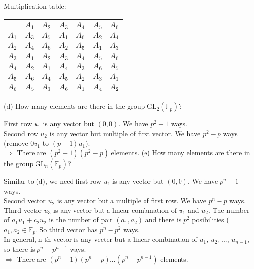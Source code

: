     Multiplication table:
    
    \begin{center}
        \begin{tabular}{|c||c|c|c|c|c|c|}
            \hline
            & $A_1$ & $A_2$ & $A_3$ & $A_4$ & $A_5$ & $A_6$ \\ \hline\hline
            $A_1$ & $A_3$ & $A_5$ & $A_1$ & $A_6$ & $A_2$ & $A_4$ \\ \hline
            $A_2$ & $A_4$ & $A_6$ & $A_2$ & $A_5$ & $A_1$ & $A_3$ \\ \hline
            $A_3$ & $A_1$ & $A_2$ & $A_3$ & $A_4$ & $A_5$ & $A_6$ \\ \hline
            $A_4$ & $A_2$ & $A_1$ & $A_4$ & $A_3$ & $A_6$ & $A_5$ \\ \hline
            $A_5$ & $A_6$ & $A_4$ & $A_5$ & $A_2$ & $A_3$ & $A_1$ \\ \hline
            $A_6$ & $A_5$ & $A_3$ & $A_6$ & $A_1$ & $A_4$ & $A_2$ \\
            \hline
        \end{tabular}
    \end{center}

(d) How many elements are there in the group $\text{GL}_2(\mathbb{F}_p)$?
    
    First row $u_1$ is any vector but $(0, 0)$. We have $p^2-1$ ways. \\ Second row $u_2$ is any vector but multiple of first vector. We have $p^2-p$ ways (remove $0u_1$ to $(p-1)u_1$). \\ $\Rightarrow$ There are $(p^2-1)(p^2-p)$ elements.
(e) How many elements are there in the group $\text{GL}_n(\mathbb{F}_p)$?
    
    Similar to (d), we need first row $u_1$ is any vector but $(0,0)$. We have $p^n-1$ ways. \\ Second vector $u_2$ is any vector but a multiple of first row. We have $p^n-p$ ways. \\ Third vector $u_3$ is any vector but a linear combination of $u_1$ and $u_2$. The number of $a_1u_1 + a_2u_2$ is the number of pair $(a_1, a_2)$ and there is $p^2$ posibilities ($a_1, a_2 \in \mathbb{F}_p$. So third vector has $p^n-p^2$ ways. \\ In general, n-th vector is any vector but a linear combination of $u_1$, $u_2$, ..., $u_{n-1}$, so there is $p^n-p^{n-1}$ ways. \\ $\Rightarrow$ There are $(p^n-1)(p^n-p)...(p^n-p^{n-1})$ elements.

